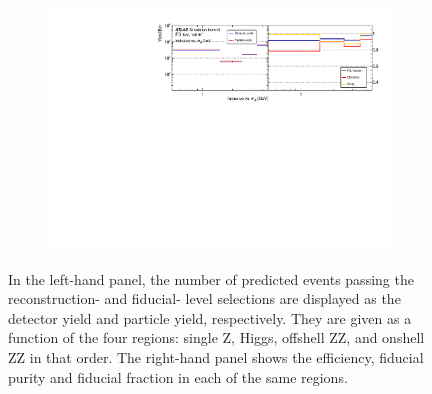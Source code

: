 \begin{figure}[tbp]
    \begin{subfigure}{.99\textwidth}\centering
      \includegraphics[width=.99\linewidth]{Figures/m4l/UnfoldingStudies/v014_inputs/inclusive_vs_m4linputs.pdf}  
    \end{subfigure}
    \caption{In the left-hand panel, the number of predicted events passing the reconstruction- and fiducial- level selections are displayed as the detector yield and particle yield, respectively. They are given as a function of the four \mFourL regions: single Z, Higgs,  offshell ZZ, and onshell ZZ in that order. The right-hand panel shows the efficiency, fiducial purity and fiducial fraction in each of the same \mFourL regions.}
    \label{fig:inclvm4lunf}
\end{figure}
